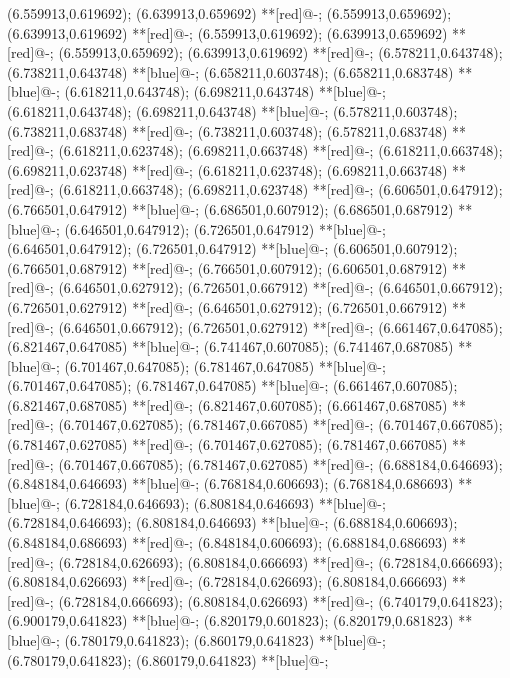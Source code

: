 (6.559913,0.619692); (6.639913,0.659692) **[red]@{-};
(6.559913,0.659692); (6.639913,0.619692) **[red]@{-};
(6.559913,0.619692); (6.639913,0.659692) **[red]@{-};
(6.559913,0.659692); (6.639913,0.619692) **[red]@{-};
(6.578211,0.643748); (6.738211,0.643748) **[blue]@{-};
(6.658211,0.603748); (6.658211,0.683748) **[blue]@{-};
(6.618211,0.643748); (6.698211,0.643748) **[blue]@{-};
(6.618211,0.643748); (6.698211,0.643748) **[blue]@{-};
(6.578211,0.603748); (6.738211,0.683748) **[red]@{-};
(6.738211,0.603748); (6.578211,0.683748) **[red]@{-};
(6.618211,0.623748); (6.698211,0.663748) **[red]@{-};
(6.618211,0.663748); (6.698211,0.623748) **[red]@{-};
(6.618211,0.623748); (6.698211,0.663748) **[red]@{-};
(6.618211,0.663748); (6.698211,0.623748) **[red]@{-};
(6.606501,0.647912); (6.766501,0.647912) **[blue]@{-};
(6.686501,0.607912); (6.686501,0.687912) **[blue]@{-};
(6.646501,0.647912); (6.726501,0.647912) **[blue]@{-};
(6.646501,0.647912); (6.726501,0.647912) **[blue]@{-};
(6.606501,0.607912); (6.766501,0.687912) **[red]@{-};
(6.766501,0.607912); (6.606501,0.687912) **[red]@{-};
(6.646501,0.627912); (6.726501,0.667912) **[red]@{-};
(6.646501,0.667912); (6.726501,0.627912) **[red]@{-};
(6.646501,0.627912); (6.726501,0.667912) **[red]@{-};
(6.646501,0.667912); (6.726501,0.627912) **[red]@{-};
(6.661467,0.647085); (6.821467,0.647085) **[blue]@{-};
(6.741467,0.607085); (6.741467,0.687085) **[blue]@{-};
(6.701467,0.647085); (6.781467,0.647085) **[blue]@{-};
(6.701467,0.647085); (6.781467,0.647085) **[blue]@{-};
(6.661467,0.607085); (6.821467,0.687085) **[red]@{-};
(6.821467,0.607085); (6.661467,0.687085) **[red]@{-};
(6.701467,0.627085); (6.781467,0.667085) **[red]@{-};
(6.701467,0.667085); (6.781467,0.627085) **[red]@{-};
(6.701467,0.627085); (6.781467,0.667085) **[red]@{-};
(6.701467,0.667085); (6.781467,0.627085) **[red]@{-};
(6.688184,0.646693); (6.848184,0.646693) **[blue]@{-};
(6.768184,0.606693); (6.768184,0.686693) **[blue]@{-};
(6.728184,0.646693); (6.808184,0.646693) **[blue]@{-};
(6.728184,0.646693); (6.808184,0.646693) **[blue]@{-};
(6.688184,0.606693); (6.848184,0.686693) **[red]@{-};
(6.848184,0.606693); (6.688184,0.686693) **[red]@{-};
(6.728184,0.626693); (6.808184,0.666693) **[red]@{-};
(6.728184,0.666693); (6.808184,0.626693) **[red]@{-};
(6.728184,0.626693); (6.808184,0.666693) **[red]@{-};
(6.728184,0.666693); (6.808184,0.626693) **[red]@{-};
(6.740179,0.641823); (6.900179,0.641823) **[blue]@{-};
(6.820179,0.601823); (6.820179,0.681823) **[blue]@{-};
(6.780179,0.641823); (6.860179,0.641823) **[blue]@{-};
(6.780179,0.641823); (6.860179,0.641823) **[blue]@{-};

